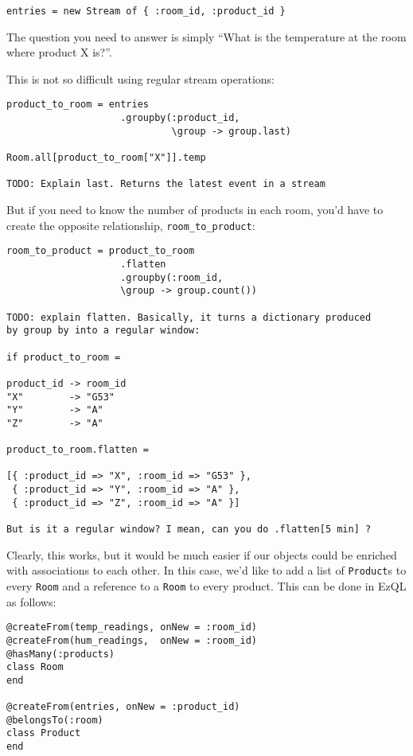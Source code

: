 \documentclass{report}
\begin{document}
\begin{verbatim}
entries = new Stream of { :room_id, :product_id }
\end{verbatim}

The question you need to answer is simply ``What is the temperature at
the room where product X is?''.

This is not so difficult using regular stream operations:

\begin{verbatim}
product_to_room = entries
                    .groupby(:product_id,
                             \group -> group.last)

Room.all[product_to_room["X"]].temp

TODO: Explain last. Returns the latest event in a stream
\end{verbatim}

But if you need to know the number of products in each room, you'd
have to create the opposite relationship, \verb=room_to_product=:

\begin{verbatim}
room_to_product = product_to_room
                    .flatten
                    .groupby(:room_id,
                    \group -> group.count())

TODO: explain flatten. Basically, it turns a dictionary produced
by group by into a regular window:

if product_to_room =

product_id -> room_id
"X"        -> "G53"
"Y"        -> "A"
"Z"        -> "A"

product_to_room.flatten =

[{ :product_id => "X", :room_id => "G53" },
 { :product_id => "Y", :room_id => "A" },
 { :product_id => "Z", :room_id => "A" }]

But is it a regular window? I mean, can you do .flatten[5 min] ?

\end{verbatim}

Clearly, this works, but it would be much easier if our objects could
be enriched with associations to each other. In this case, we'd like
to add a list of \verb=Product=s to every \verb=Room= and a reference
to a \verb=Room= to every product. This can be done in EzQL as
follows:

\begin{verbatim}
@createFrom(temp_readings, onNew = :room_id)
@createFrom(hum_readings,  onNew = :room_id)
@hasMany(:products)
class Room
end

@createFrom(entries, onNew = :product_id)
@belongsTo(:room)
class Product
end
\end{verbatim}
\end{document}
